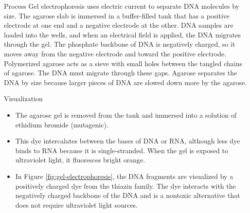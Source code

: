 \documentclass[
  ignorenonframetext,
  aspectratio=169]{beamer}
\providecommand{\tightlist}{%
  \setlength{\itemsep}{0pt}\setlength{\parskip}{0pt}}
\begin{document}
\begin{frame}{Process}
\protect\hypertarget{process}{}
Gel electrophoresis uses electric current to separate DNA molecules by
size. The agarose slab is immersed in a buffer-filled tank that has a
positive electrode at one end and a negative electrode at the other. DNA
samples are loaded into the wells, and when an electrical field is
applied, the DNA migrates through the gel. The phosphate backbone of DNA
is negatively charged, so it moves away from the negative electrode and
toward the positive electrode. Polymerized agarose acts as a sieve with
small holes between the tangled chains of agarose. The DNA must migrate
through these gaps. Agarose separates the DNA by size because larger
pieces of DNA are slowed down more by the agarose.
\end{frame}

\begin{frame}{Visualization}
\protect\hypertarget{visualization}{}
\begin{itemize}
\tightlist
\item
  The agarose gel is removed from the tank and immersed into a solution
  of ethidium bromide (mutagenic).
\item
  This dye intercalates between the bases of DNA or RNA, although less
  dye binds to RNA because it is single-stranded. When the gel is
  exposed to ultraviolet light, it fluoresces bright orange.
\item
  In Figure \ref{fig:gel-electrophoresis}, the DNA fragments are
  visualized by a positively charged dye from the thiazin family. The
  dye interacts with the negatively charged backbone of the DNA and is a
  nontoxic alternative that does not require ultraviolet light sources.
\end{itemize}
\end{frame}
\end{document}
